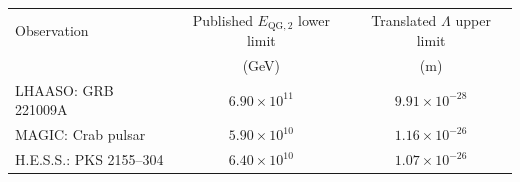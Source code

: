 \begin{tabular}{lcc}
\hline
Observation & Published $E_{\mathrm{QG},2}$ lower limit & Translated $\Lambda$ upper limit \\
 & (GeV) & (m) \\ \hline
LHAASO: GRB 221009A & $6.90\times10^{11}$ & $9.91\times10^{-28}$ \\
MAGIC: Crab pulsar & $5.90\times10^{10}$ & $1.16\times10^{-26}$ \\
H.E.S.S.: PKS 2155--304 & $6.40\times10^{10}$ & $1.07\times10^{-26}$ \\
\hline
\end{tabular}
